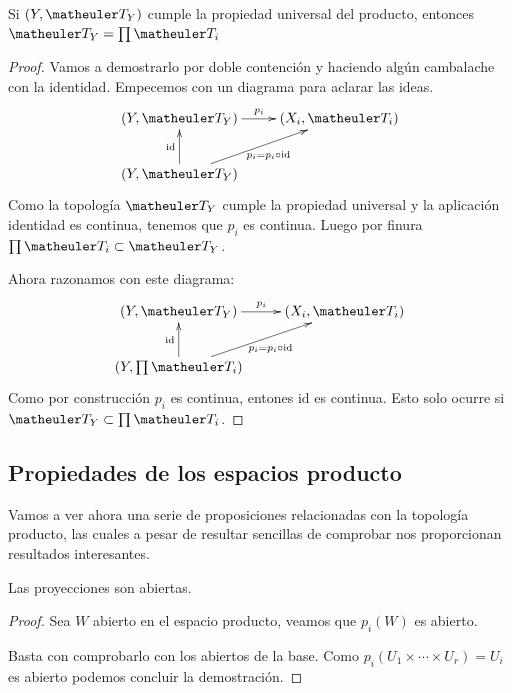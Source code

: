 \begin{prop}
	Si $(Y,\T_Y)$ cumple la propiedad universal del producto, entonces $\T_Y = \prod\T_i $
\end{prop}
\begin{proof}
	Vamos a demostrarlo por doble contención y haciendo algún cambalache con la identidad.
	Empecemos con un diagrama para aclarar las ideas.
	\[\xymatrix{
		(Y,\T_Y) \ar[r]^{p_i} & 
		(X_i,\T_i) \\
		(Y,\T_Y) \ar[u]^{\text{id}} \ar[ru]_{p_i = p_i \circ \text{id}} &
	}\]
	Como la topología $\T_Y$ cumple la propiedad universal y la aplicación identidad es continua, tenemos que $p_i$ es continua. Luego por finura $ \prod\T_i \subset \T_Y$.
	
	Ahora razonamos con este diagrama:
	\[\xymatrix{
		(Y,\T_Y) \ar[r]^{p_i} & 
		(X_i,\T_i) \\
		(Y,\prod\T_i) \ar[u]^{\text{id}} \ar[ru]_{p_i = p_i \circ \text{id}} &
	}\]	
	Como por construcción $p_i$ es continua, entones $\text{id}$ es continua. Esto solo ocurre si $\T_Y \subset \prod\T_i$. 	
\end{proof}
\subsection{Propiedades de los espacios producto}

Vamos a ver ahora una serie de proposiciones relacionadas con la topología producto, las cuales a pesar de resultar sencillas de comprobar nos proporcionan resultados interesantes.

\begin{prop}
	Las proyecciones son abiertas.
	
	\begin{proof}
		Sea $W$ abierto en el espacio producto, veamos que $p_i(W)$ es abierto.
		
		Basta con comprobarlo con los abiertos de la base.  Como  $p_i(U_1\times\cdots\times U_r)=U_i$ es abierto podemos concluir la demostración.
	\end{proof}
\end{prop}

